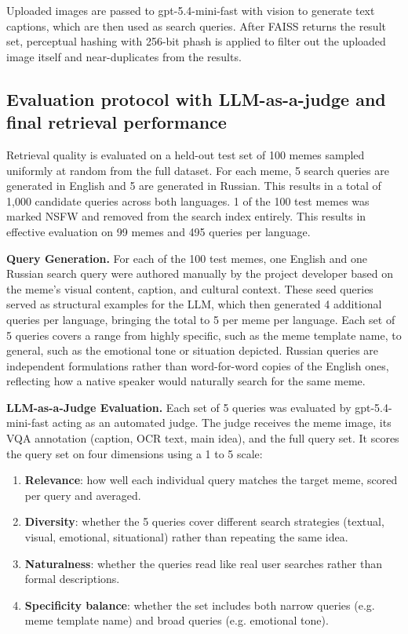 \documentclass[a4paper,12pt]{article}
\begin{document}
Uploaded images are passed to gpt-5.4-mini-fast with vision to generate text captions, which are then used as search queries. After FAISS returns the result set, perceptual hashing with 256-bit phash is applied to filter out the uploaded image itself and near-duplicates from the results.

\subsection{Evaluation protocol with LLM-as-a-judge and final retrieval performance}

Retrieval quality is evaluated on a held-out test set of 100 memes sampled uniformly at random from the full dataset. For each meme, 5 search queries are generated in English and 5 are generated in Russian. This results in a total of 1,000 candidate queries across both languages. 1 of the 100 test memes was marked NSFW and removed from the search index entirely. This results in effective evaluation on 99 memes and 495 queries per language.

\textbf{Query Generation.} For each of the 100 test memes, one English and one Russian search query were authored manually by the project developer based on the meme's visual content, caption, and cultural context. These seed queries served as structural examples for the LLM, which then generated 4 additional queries per language, bringing the total to 5 per meme per language. Each set of 5 queries covers a range from highly specific, such as the meme template name, to general, such as the emotional tone or situation depicted. Russian queries are independent formulations rather than word-for-word copies of the English ones, reflecting how a native speaker would naturally search for the same meme.

\textbf{LLM-as-a-Judge Evaluation.} Each set of 5 queries was evaluated by gpt-5.4-mini-fast acting as an automated judge. The judge receives the meme image, its VQA annotation (caption, OCR text, main idea), and the full query set. It scores the query set on four dimensions using a 1 to 5 scale:
\begin{enumerate}
    \item \textbf{Relevance}: how well each individual query matches the target meme, scored per query and averaged.
    \item \textbf{Diversity}: whether the 5 queries cover different search strategies (textual, visual, emotional, situational) rather than repeating the same idea.
    \item \textbf{Naturalness}: whether the queries read like real user searches rather than formal descriptions.
    \item \textbf{Specificity balance}: whether the set includes both narrow queries (e.g. meme template name) and broad queries (e.g. emotional tone).
\end{enumerate}
\end{document}
